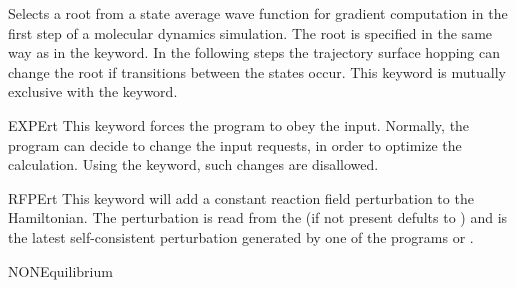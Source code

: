 \begin{keywordlist}
Selects a root from a state average wave function for gradient computation in
the first step of a molecular dynamics simulation. The root is specified in
the same way as in the  keyword. In the following steps the
trajectory surface hopping can change the root if transitions between the
states occur. This keyword is mutually exclusive with the  keyword.
\item[EXPErt]
This keyword forces the program to obey the input. Normally, the program can
decide to  change the input requests, in order to optimize the calculation.
Using the  keyword, such changes are disallowed.
\item[RFPErt]
This keyword will add a constant reaction field perturbation to the
Hamiltonian. The perturbation is read from the  (if not present defults to ) and
is the latest self-consistent perturbation generated
by one of the programs  or .
\item[NONEquilibrium]

\end{keywordlist}
